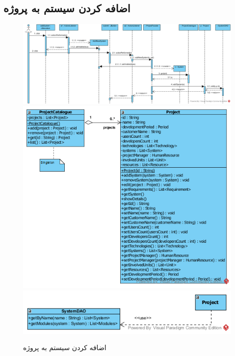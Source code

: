 \begin{landscape}
\newpage
\section{اضافه کردن سیستم به پروژه}
\begin{figure}[H]
	\centering
	\includegraphics[scale=0.55]{img/sequence-design/AddSystemToProject}
	\includegraphics[scale=0.6]{img/sequence-design/AddSystemToProjectC}
	\includegraphics[scale=0.6]{img/sequence-design/AddSystemToProjectD}
	\caption{اضافه کردن سیستم به پروژه}
\end{figure}

\newpage

\end{landscape}
